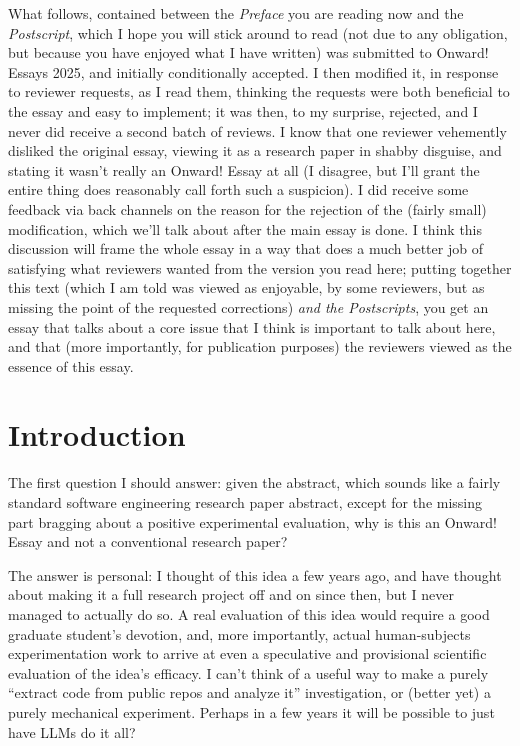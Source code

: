 \documentclass[sigplan,screen]{acmart}
\begin{document}
What follows, contained between the \emph{Preface} you are reading now
and the \emph{Postscript}, which I hope you will stick around to read
(not due to any obligation, but because you have enjoyed what I have
written) was submitted to Onward! Essays 2025, and initially
conditionally accepted.  I then modified it, in response to reviewer
requests, as I read them, thinking the requests were both beneficial
to the essay and easy to implement; it was then, to my surprise, rejected, and I
never did receive a second batch of reviews.  I know that one reviewer
vehemently disliked the original essay, viewing it as a research paper
in shabby disguise, and stating it wasn't really an Onward! Essay at
all (I disagree, but I'll grant the entire thing does reasonably call
forth such a suspicion).  I did receive some feedback via back
channels on the reason
for the rejection of the (fairly small) modification, which we'll talk
about after the main essay is done.  I think this discussion will
frame the whole essay in a way that does a much better job of
satisfying what reviewers wanted from the version you read here; putting
together this text (which I am told was viewed as enjoyable, by some
reviewers, but as missing the point of the requested corrections)
\emph{and the Postscripts}, you get an essay that talks about a core issue that I think is
important to talk about here, and that (more importantly, for
publication purposes) the reviewers viewed as the essence of this essay.

\section{Introduction}

The first question I should answer: given the abstract, which sounds
like a fairly standard software engineering research paper abstract,
except for the missing part bragging
about a positive experimental evaluation, why is this an Onward! Essay
and not a conventional research paper?

The answer is personal:  I thought of this idea a few years ago, and
have thought about making it a full research project off and on since
then, but I
never managed to actually do so.  A real evaluation of this idea would
require a good graduate student's devotion, and, more importantly,
actual human-subjects experimentation work to arrive at even a
speculative and provisional scientific evaluation of the idea's
efficacy.  I can't think of a useful way to make a purely ``extract
code from public repos and analyze it'' investigation, or (better yet)
a purely mechanical experiment.  Perhaps in a few years it will be
possible to just have LLMs do it all?
\end{document}
